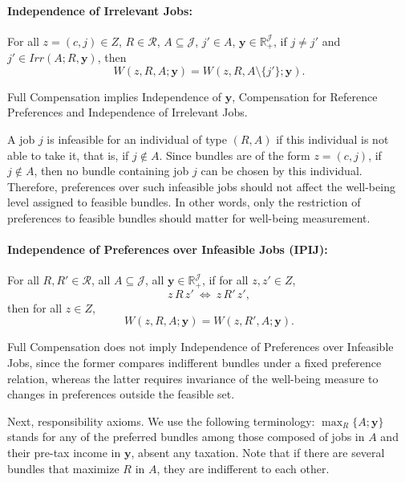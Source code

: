 \documentclass[12pt,thmsb]{article}
\begin{document}
\paragraph{Independence of Irrelevant Jobs:} For all $z=(c,j)\in Z$, $R\in \mathcal{R}$, $A\subseteq \mathcal{J}$, $j'\in A$, $\mathbf{y} \in \mathbb{R}_{+}^{\mathcal{J}}$, if $j\neq j'$ and $j'\in Irr(A;R,\mathbf{y})$, then
\begin{equation*}
W(z,R,A;\mathbf{y})=W(z,R,A\setminus\{j'\};\mathbf{y}).
\end{equation*}

Full Compensation implies Independence of $\mathbf{y}$, Compensation for Reference Preferences and Independence of Irrelevant Jobs.

A job $j$ is infeasible for an individual of type $(R,A)$ if this individual is not able to take it, that is, if $j\notin A$. Since bundles are of the form $z=(c,j)$, if $j\notin A$, then no bundle containing job $j$ can be chosen by this individual. Therefore, preferences over such infeasible jobs should not affect the well-being level assigned to feasible bundles. In other words, only the restriction of preferences to feasible bundles should matter for well-being measurement.

\paragraph{Independence of Preferences over Infeasible Jobs (IPIJ):} For all $R,R'\in\mathcal R$, all $A\subseteq \mathcal J$, all $\mathbf y\in\mathbb R_+^{\mathcal J}$, if for all $z,z'\in Z$,
\begin{equation*}
z\,R\,z' \ \Longleftrightarrow\ z\,R'\,z',
\end{equation*}
then for all $z\in Z$,
\begin{equation*}
W(z,R,A;\mathbf y)=W(z,R',A;\mathbf y).
\end{equation*}

Full Compensation does not imply Independence of Preferences over Infeasible Jobs, since the former compares indifferent bundles under a fixed preference relation, whereas the latter requires invariance of the well-being measure to changes in preferences outside the feasible set.

Next, responsibility axioms. We use the following terminology: $\max_{R}\{A;\mathbf{y}\}$ stands for any of the preferred bundles among those composed of jobs in $A$ and their pre-tax income in $\mathbf{y}$, absent any taxation. Note that if there are several bundles that maximize $R$ in $A$, they are indifferent to each other.
\end{document}

